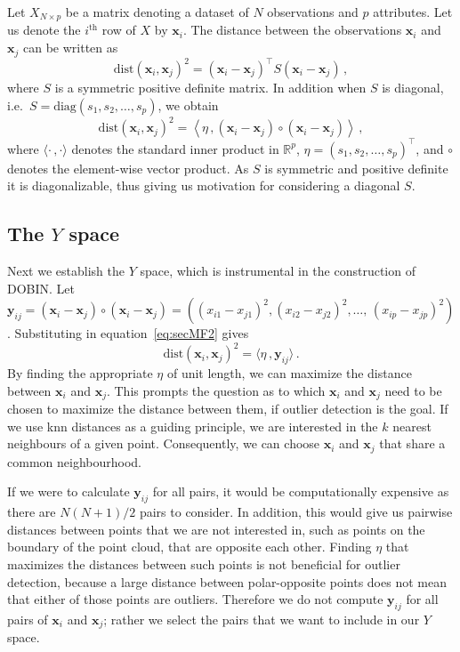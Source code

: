 \documentclass[letter,12pt]{article}
\newcommand{\dist}{\text{dist}}
\newcommand{\diag}{\text{diag}}
\begin{document}
Let $X_{N \times p}$ be a matrix denoting a dataset of $N$ observations and $p$ attributes. Let us denote the $i^{\text{th}}$ row of $X$ by $\bm{x}_i$. The distance between the observations $\bm{x}_i$ and $\bm{x}_j$ can be written as
\begin{equation}\label{eq:secMF1}
	\dist(\bm{x}_i, \bm{x}_j)^2 = ( \bm{x}_i - \bm{x}_j)^\top S ( \bm{x}_i - \bm{x}_j ) \, ,
\end{equation}
where $S$ is a symmetric positive definite matrix. In addition when $S$ is diagonal, i.e.\ $S = \diag(s_1, s_2, \dots, s_p)$, we obtain
\begin{equation}\label{eq:secMF2}
	\dist(\bm{x}_i, \bm{x}_j)^2 = \left\langle \eta\, , ( \bm{x}_i - \bm{x}_j )\circ ( \bm{x}_i - \bm{x}_j ) \right\rangle \,,
\end{equation}
where $\langle \cdot\, , \cdot \rangle$ denotes the standard inner product in $\mathbb{R}^p$, $\eta = (s_1, s_2, \dots, s_p)^\top$, and $\circ$ denotes the element-wise vector product. As $S$ is symmetric and positive definite it is diagonalizable, thus giving us motivation for considering a diagonal $S$.

\subsection{The $Y$ space}\label{sec:MathFrame1}

Next we establish the $Y$ space, which is instrumental in the construction of DOBIN\@. Let $\bm{y}_{ij} = ( \bm{x}_i - \bm{x}_j )\circ ( \bm{x}_i - \bm{x}_j ) = \left( ( x_{i1} - x_{j1} )^2, ( x_{i2} - x_{j2} )^2, \dots, \, ( x_{ip} - x_{jp} )^2 \right)$. Substituting in equation~\eqref{eq:secMF2} gives
\begin{equation}\label{eq:secMF3}
	\dist(\bm{x}_i, \bm{x}_j)^2 = \langle \eta\, , \bm{y}_{ij} \rangle\, .
\end{equation}
By finding the appropriate $\eta$ of unit length, we can maximize the distance between $\bm{x}_i$ and $\bm{x}_j$. This prompts the question as to which $\bm{x}_i$ and $\bm{x}_j$ need to be chosen to maximize the distance between them, if outlier detection is the goal. If we use knn distances as a guiding principle, we are interested in the $k$ nearest neighbours of a given point. Consequently, we can choose $\bm{x}_i$ and $\bm{x}_j$ that share a common neighbourhood.

If we were to calculate $\bm{y}_{ij}$ for all pairs, it would be computationally expensive as there are $N(N+1)/2$ pairs to consider. In addition, this would give us pairwise distances between points that we are not interested in, such as points on the boundary of the point cloud, that are opposite each other. Finding $\eta$ that maximizes the distances between such points is not beneficial for outlier detection, because a large distance between polar-opposite points does not mean that either of those points are outliers. Therefore we do not compute $\bm{y}_{ij}$ for all pairs of $\bm{x}_i$ and $\bm{x}_j$; rather we select the pairs that we want to include in our $Y$ space.
\end{document}
